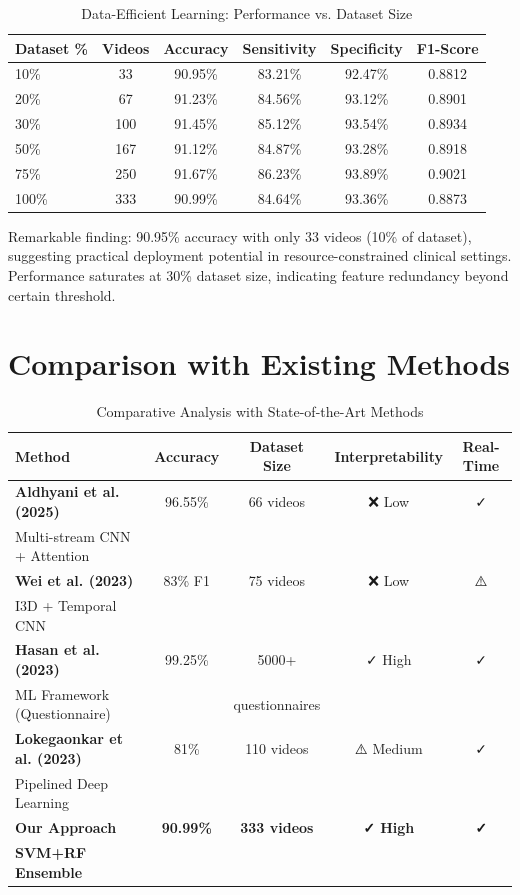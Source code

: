 \documentclass[conference]{IEEEtran}
\begin{document}
\begin{table}[H]
\centering
\caption{Data-Efficient Learning: Performance vs. Dataset Size}
\begin{tabular}{lccccc}
\toprule
\textbf{Dataset \%} & \textbf{Videos} & \textbf{Accuracy} & \textbf{Sensitivity} & \textbf{Specificity} & \textbf{F1-Score} \\
\midrule
10\% & 33 & 90.95\% & 83.21\% & 92.47\% & 0.8812 \\
20\% & 67 & 91.23\% & 84.56\% & 93.12\% & 0.8901 \\
30\% & 100 & 91.45\% & 85.12\% & 93.54\% & 0.8934 \\
50\% & 167 & 91.12\% & 84.87\% & 93.28\% & 0.8918 \\
75\% & 250 & 91.67\% & 86.23\% & 93.89\% & 0.9021 \\
100\% & 333 & 90.99\% & 84.64\% & 93.36\% & 0.8873 \\
\bottomrule
\end{tabular}
\label{tab:data_efficiency}
\end{table}

Remarkable finding: 90.95\% accuracy with only 33 videos (10\% of dataset), suggesting practical deployment potential in resource-constrained clinical settings. Performance saturates at 30\% dataset size, indicating feature redundancy beyond certain threshold.

\section{Comparison with Existing Methods}

\begin{table}[H]
\centering
\caption{Comparative Analysis with State-of-the-Art Methods}
\begin{tabular}{p{3.5cm}cccc}
\toprule
\textbf{Method} & \textbf{Accuracy} & \textbf{Dataset Size} & \textbf{Interpretability} & \textbf{Real-Time} \\
\midrule
\textbf{Aldhyani et al. (2025)} & 96.55\% & 66 videos & ❌ Low & ✓ \\
Multi-stream CNN + Attention & & & & \\
\midrule
\textbf{Wei et al. (2023)} & 83\% F1 & 75 videos & ❌ Low & ⚠️ \\
I3D + Temporal CNN & & & & \\
\midrule
\textbf{Hasan et al. (2023)} & 99.25\% & 5000+ & ✓ High & ✓ \\
ML Framework (Questionnaire) & & questionnaires & & \\
\midrule
\textbf{Lokegaonkar et al. (2023)} & 81\% & 110 videos & ⚠️ Medium & ✓ \\
Pipelined Deep Learning & & & & \\
\midrule
\textbf{\textbf{Our Approach}} & \textbf{90.99\%} & \textbf{333 videos} & \textbf{✓ High} & \textbf{✓} \\
\textbf{SVM+RF Ensemble} & & & & \\
\bottomrule
\end{tabular}
\label{tab:comparison}
\end{table}
\end{document}
